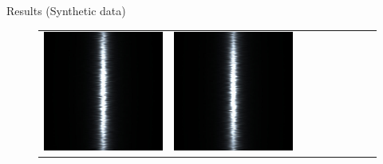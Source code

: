 \documentclass[final]{beamer}
\newlength{\twocolwid}
\newlength{\resultwidth}
\begin{document}
\begin{frame}[t]
\begin{columns}[t]
\begin{column}{\twocolwid}
\begin{block}{Results (Synthetic data)}
\begin{figure}[t]
\begin{tabular}{ccrclcccc}
            		\includegraphics[width=\resultwidth]{synth/metal/good3.jpg} &
            		\includegraphics[width=\resultwidth]{synth/metal/bad1.jpg}
            		\\

\end{tabular}
\end{figure}
\end{block}
\end{column}
\end{columns}
\end{frame}
\end{document}
